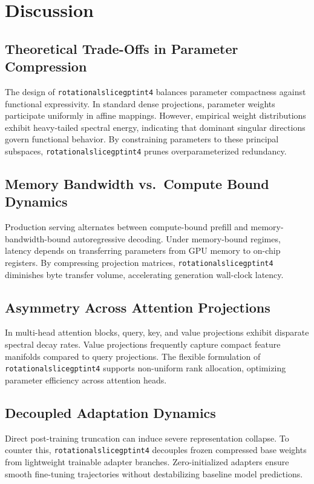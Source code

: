 \section{Discussion}

\subsection{Theoretical Trade-Offs in Parameter Compression}
The design of \texttt{rotationalslicegptint4} balances parameter compactness against functional expressivity. In standard dense projections, parameter weights participate uniformly in affine mappings. However, empirical weight distributions exhibit heavy-tailed spectral energy, indicating that dominant singular directions govern functional behavior. By constraining parameters to these principal subspaces, \texttt{rotationalslicegptint4} prunes overparameterized redundancy.

\subsection{Memory Bandwidth vs.\ Compute Bound Dynamics}
Production serving alternates between compute-bound prefill and memory-bandwidth-bound autoregressive decoding. Under memory-bound regimes, latency depends on transferring parameters from GPU memory to on-chip registers. By compressing projection matrices, \texttt{rotationalslicegptint4} diminishes byte transfer volume, accelerating generation wall-clock latency.

\subsection{Asymmetry Across Attention Projections}
In multi-head attention blocks, query, key, and value projections exhibit disparate spectral decay rates. Value projections frequently capture compact feature manifolds compared to query projections. The flexible formulation of \texttt{rotationalslicegptint4} supports non-uniform rank allocation, optimizing parameter efficiency across attention heads.

\subsection{Decoupled Adaptation Dynamics}
Direct post-training truncation can induce severe representation collapse. To counter this, \texttt{rotationalslicegptint4} decouples frozen compressed base weights from lightweight trainable adapter branches. Zero-initialized adapters ensure smooth fine-tuning trajectories without destabilizing baseline model predictions.

